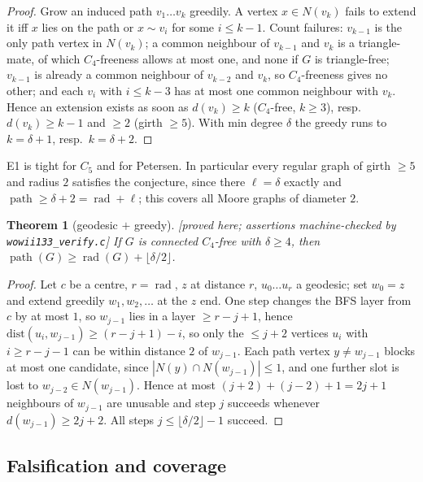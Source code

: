 \documentclass[11pt]{article}
\theoremstyle{plain}
\newtheorem{theorem}{Theorem}[section]
\theoremstyle{definition}
\theoremstyle{remark}
\numberwithin{equation}{section}
\newcommand{\rad}{\operatorname{rad}}
\newcommand{\pth}{\operatorname{path}}
\newcommand{\statusbox}[1]{{\small\sloppy\textsf{[#1]}}}
\newcommand{\PRV}[1]{\statusbox{proved here; assertions machine-checked by \texttt{#1}}}
\begin{document}
\begin{proof}
Grow an induced path $v_1 \dots v_k$ greedily. A vertex $x \in N(v_k)$ fails to extend it iff
$x$ lies on the path or $x \sim v_i$ for some $i \le k-1$. Count failures: $v_{k-1}$ is the
only path vertex in $N(v_k)$; a common neighbour of $v_{k-1}$ and $v_k$ is a triangle-mate,
of which $C_4$-freeness allows at most one, and none if $G$ is triangle-free; $v_{k-1}$ is
already a common neighbour of $v_{k-2}$ and $v_k$, so $C_4$-freeness gives no other; and each
$v_i$ with $i \le k-3$ has at most one common neighbour with $v_k$. Hence an extension exists
as soon as $d(v_k) \ge k$ ($C_4$-free, $k \ge 3$), resp.\ $d(v_k) \ge k-1$ and $\ge 2$
(girth $\ge 5$). With min degree $\delta$ the greedy runs to $k = \delta+1$, resp.\
$k = \delta + 2$.
\end{proof}

E1 is tight for $C_5$ and for Petersen. In particular every regular graph of girth $\ge 5$
and radius $2$ satisfies the conjecture, since there $\ell = \delta$ exactly and
$\pth \ge \delta + 2 = \rad + \ell$; this covers all Moore graphs of diameter $2$.

\begin{theorem}[geodesic $+$ greedy]\label{thm:F}
\PRV{wowii133\_verify.c}
If $G$ is connected $C_4$-free with $\delta \ge 4$, then
$\pth(G) \ge \rad(G) + \lfloor \delta/2\rfloor$.
\end{theorem}

\begin{proof}
Let $c$ be a centre, $r = \rad$, $z$ at distance $r$, $u_0 \dots u_r$ a geodesic; set
$w_0 = z$ and extend greedily $w_1, w_2, \dots$ at the $z$ end. One step changes the BFS
layer from $c$ by at most $1$, so $w_{j-1}$ lies in a layer $\ge r-j+1$, hence
$\mathrm{dist}(u_i, w_{j-1}) \ge (r-j+1) - i$, so only the $\le j+2$ vertices $u_i$ with
$i \ge r-j-1$ can be within distance $2$ of $w_{j-1}$. Each path vertex $y \ne w_{j-1}$
blocks at most one candidate, since $|N(y) \cap N(w_{j-1})| \le 1$, and one further slot is
lost to $w_{j-2} \in N(w_{j-1})$. Hence at most $(j+2) + (j-2) + 1 = 2j+1$ neighbours of
$w_{j-1}$ are unusable and step $j$ succeeds whenever $d(w_{j-1}) \ge 2j+2$. All steps
$j \le \lfloor\delta/2\rfloor - 1$ succeed.
\end{proof}

\subsection{Falsification and coverage}\label{sec:falsification}
\end{document}
